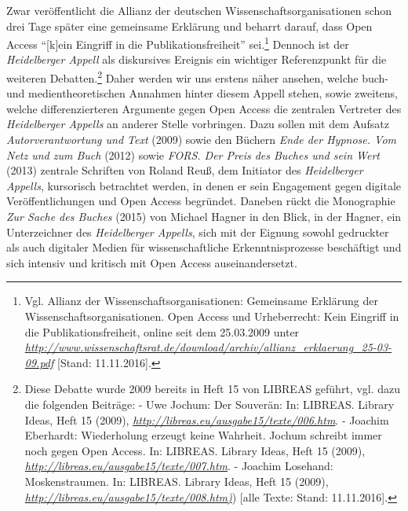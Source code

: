\documentclass[a4paper,
fontsize=11pt,
oneside,
numbers=noperiodatend,
parskip=half-,
bibliography=totoc,
final
]{scrartcl}
\begin{document}
Zwar veröffentlicht die Allianz der deutschen
Wissenschaftsorganisationen schon drei Tage später eine gemeinsame
Erklärung und beharrt darauf, dass Open Access \enquote{{[}k{]}ein
Eingriff in die Publikationsfreiheit} sei.\footnote{Vgl. Allianz der
  Wissenschaftsorganisationen: Gemeinsame Erklärung der
  Wissenschaftsorganisationen. Open Access und Urheberrecht: Kein
  Eingriff in die Publikationsfreiheit, online seit dem 25.03.2009 unter
  \href{http://www.wissenschaftsrat.de/download/archiv/allianz_erklaerung_25-03-09.pdf}{\emph{http://www.wissenschaftsrat.de/download/archiv/allianz\_erklaerung\_25-03-09.pdf}}
  {[}Stand: 11.11.2016{]}.} Dennoch ist der \emph{Heidelberger Appell}
als diskursives Ereignis ein wichtiger Referenzpunkt für die weiteren
Debatten.\footnote{Diese Debatte wurde 2009 bereits in Heft 15 von
  LIBREAS geführt, vgl. dazu die folgenden Beiträge: - Uwe Jochum: Der
  Souverän: In: LIBREAS. Library Ideas, Heft 15 (2009),
  \href{http://libreas.eu/ausgabe15/texte/006.htm}{\emph{http://libreas.eu/ausgabe15/texte/006.htm}}.
  - Joachim Eberhardt: Wiederholung erzeugt keine Wahrheit. Jochum
  schreibt immer noch gegen Open Access. In: LIBREAS. Library Ideas,
  Heft 15 (2009),
  \href{http://libreas.eu/ausgabe15/texte/007.htm}{\emph{http://libreas.eu/ausgabe15/texte/007.htm}}.
  - Joachim Losehand: Moskenstraumen. In: LIBREAS. Library Ideas, Heft
  15 (2009),
  \href{http://libreas.eu/ausgabe15/texte/008.htm}{\emph{http://libreas.eu/ausgabe15/texte/008.htm)}})
  {[}alle Texte: Stand: 11.11.2016{]}.} Daher werden wir uns erstens
näher ansehen, welche buch- und medientheoretischen Annahmen hinter
diesem Appell stehen, sowie zweitens, welche differenzierteren Argumente
gegen Open Access die zentralen Vertreter des \emph{Heidelberger
Appells} an anderer Stelle vorbringen. Dazu sollen mit dem Aufsatz
\emph{Autorverantwortung und Text} (2009) sowie den Büchern \emph{Ende
der Hypnose. Vom Netz und zum Buch} (2012) sowie \emph{FORS. Der Preis
des Buches und sein Wert} (2013) zentrale Schriften von Roland Reuß, dem
Initiator des \emph{Heidelberger Appells}, kursorisch betrachtet werden,
in denen er sein Engagement gegen digitale Veröffentlichungen und Open
Access begründet. Daneben rückt die Monographie \emph{Zur Sache des
Buches} (2015) von Michael Hagner in den Blick, in der Hagner, ein
Unterzeichner des \emph{Heidelberger Appells}, sich mit der Eignung
sowohl gedruckter als auch digitaler Medien für wissenschaftliche
Erkenntnisprozesse beschäftigt und sich intensiv und kritisch mit Open
Access auseinandersetzt.
\end{document}
